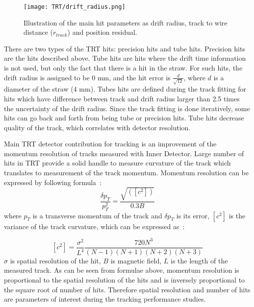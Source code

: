 \begin{figure}
\centering
\texttt{[image: TRT/drift\_radius.png]}
\caption{ 
 Illustration of the main hit parameters as drift radius, track to wire distance ($r_{track}$) and position residual.
}
\label{fig:drift_radius}
\end{figure}

There are two types of the TRT hits: precision hits and tube hits. Precision hits are the hits described above. Tube hits are hits where the drift time 
information is not used, but only the fact that there is a hit in the straw. For such hits, the drift radius is assigned to be 0 mm, and the hit error is $\frac{d}{\sqrt{12}}$, where
$d$ is a diameter of the straw (4 mm). Tubes hits are defined during the track fitting for hits which have difference between track and drift radius larger than
2.5 times the uncertainty of the drift radius. Since the track fitting is done iteratively, some hits can go back and forth from being tube or precision hits.
Tube hits decrease quality of the track, which correlates with detector resolution.

Main TRT detector contribution for tracking is an improvement of the momentum resolution of tracks measured with Inner Detector. Large number of hits in TRT provide
a solid handle to measure curvature of the track which translates to measurement of the track momentum. Momentum resolution can be expressed by following formula~\cite{mom_res_book,Gluckstern:1963ng}:
\begin{equation}
\dfrac{\delta p_T}{p_T^2} = \dfrac{\sqrt{([c^2])}}{0.3B}
 \label{eq:momentum_resolution}
\end{equation}
where $p_T$ is a transverse momentum of the track and $\delta p_T$ is its error, $[c^2]$ is the variance of the track curvature, which can be expressed as~\cite{mom_res_book}:

\begin{equation}
[c^2] = \dfrac{\sigma^2}{L^4}\dfrac{720 N^3}{(N-1)(N+1)(N+2)(N+3)}
\end{equation}
$\sigma$ is spatial resolution of the hit, $B$ is magnetic field, $L$ is the length of the measured track.
As can be seen from formulae above, momentum resolution is proportional to the spatial resolution of the hits and is inversely proportional to the square root of 
number of hits. Therefore spatial resolution and number of hits are parameters of interest during the tracking performance studies.

